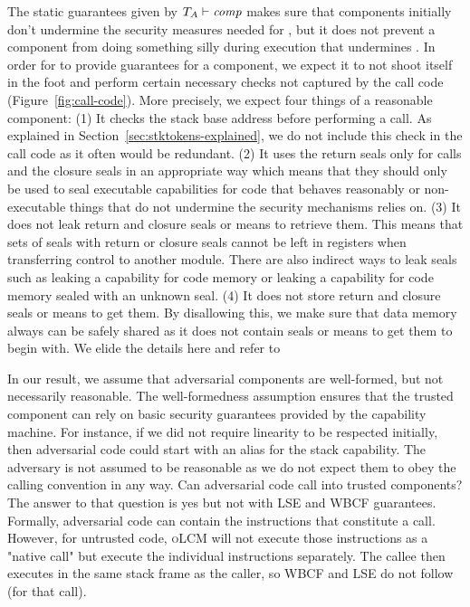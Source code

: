 \documentclass[acmsmall,screen]{acmart}\settopmatter{}
\renewcommand{\comp}{\var{comp}}
\newcommand{\wdjud}[2][ ]{#1 \vdash #2}
\newcommand{\srccm}{\textsc{oLCM}}
\begin{document}
The static guarantees given by $\wdjud[\ta]{\comp}$ makes sure that components initially don't undermine the security measures needed for \stktokens{}, but it does not prevent a component from doing something silly during execution that undermines \stktokens{}.
In order for \stktokens{} to provide guarantees for a component, we expect it to not shoot itself in the foot and perform certain necessary checks not captured by the call code (Figure~\ref{fig:call-code}).
More precisely, we expect four things of a reasonable component: (1) It checks the stack base address before performing a call.
As explained in Section~\ref{sec:stktokens-explained}, we do not include this check in the call code as it often would be redundant.
(2) It uses the return seals only for calls and the closure seals in an appropriate way which means that they should only be used to seal executable capabilities for code that behaves reasonably or non-executable things that do not undermine the security mechanisms \stktokens{} relies on.
(3) It does not leak return and closure seals or means to retrieve them.
This means that sets of seals with return or closure seals cannot be left in registers when transferring control to another module.
There are also indirect ways to leak seals such as leaking a capability for code memory or leaking a capability for code memory sealed with an unknown seal.
(4) It does not store return and closure seals or means to get them.
By disallowing this, we make sure that data memory always can be safely shared as it does not contain seals or means to get them to begin with.
We elide the details here and refer to~\citet{technical_report}

In our result, we assume that adversarial components are well-formed, but not necessarily reasonable. The well-formedness assumption ensures that the trusted component can rely on basic security guarantees provided by the capability machine. For instance, if we did not require linearity to be respected initially, then adversarial code could start with an alias for the stack capability. The adversary is not assumed to be reasonable as we do not expect them to obey the calling convention in any way. Can adversarial code call into trusted components? The answer to that question is yes but not with LSE and WBCF guarantees. Formally, adversarial code can contain the instructions that constitute a call. However, for untrusted code, \srccm{} will not execute those instructions as a "native call" but execute the individual instructions separately. The callee then executes in the same stack frame as the caller, so WBCF and LSE do not follow (for that call).
\end{document}
